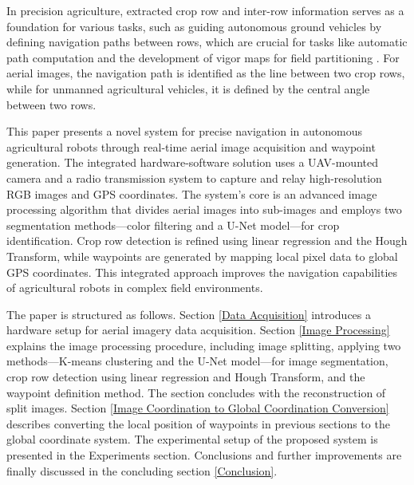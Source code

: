 \documentclass[conference]{IEEEtran}
\begin{document}
In precision agriculture, extracted crop row and inter-row information serves as a foundation for various tasks, such as guiding autonomous ground vehicles by defining navigation paths between rows, which are crucial for tasks like automatic path computation and the development of vigor maps for field partitioning \cite{b11}. For aerial images, the navigation path is identified as the line between two crop rows, while for unmanned agricultural vehicles, it is defined by the central angle between two rows\cite{b1}.


This paper presents a novel system for precise navigation in autonomous agricultural robots through real-time aerial image acquisition and waypoint generation. The integrated hardware-software solution uses a UAV-mounted camera and a radio transmission system to capture and relay high-resolution RGB images and GPS coordinates. The system's core is an advanced image processing algorithm that divides aerial images into sub-images and employs two segmentation methods—color filtering and a U-Net model—for crop identification. Crop row detection is refined using linear regression and the Hough Transform, while waypoints are generated by mapping local pixel data to global GPS coordinates. This integrated approach improves the navigation capabilities of agricultural robots in complex field environments.

The paper is structured as follows. Section \ref{Data Acquisition} introduces a hardware setup for aerial imagery data acquisition. Section \ref{Image Processing} explains the image processing procedure, including image splitting, applying two methods—K-means clustering and the U-Net model—for image segmentation, crop row detection using linear regression and Hough Transform, and the waypoint definition method. The section concludes with the reconstruction of split images. Section \ref{Image Coordination to Global Coordination Conversion} describes converting the local position of waypoints in previous sections to the global coordinate system. The experimental setup of the proposed system is presented in the Experiments section. Conclusions and further improvements are finally discussed in the concluding section
\ref{Conclusion}.
\end{document}
